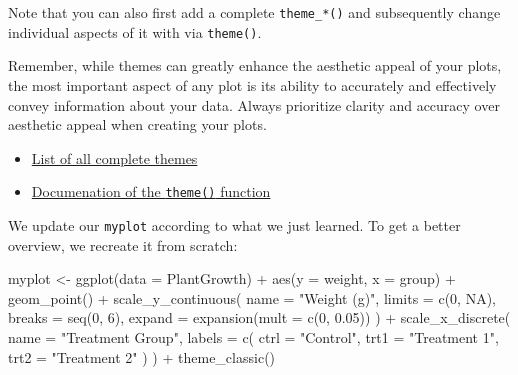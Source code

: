 \documentclass[
  letterpaper,
  DIV=11,
  numbers=noendperiod]{scrartcl}
\newenvironment{Shaded}{\begin{snugshade}}{\end{snugshade}}
\newcommand{\AttributeTok}[1]{\textcolor[rgb]{0.40,0.45,0.13}{#1}}
\newcommand{\ConstantTok}[1]{\textcolor[rgb]{0.56,0.35,0.01}{#1}}
\newcommand{\DecValTok}[1]{\textcolor[rgb]{0.68,0.00,0.00}{#1}}
\newcommand{\FloatTok}[1]{\textcolor[rgb]{0.68,0.00,0.00}{#1}}
\newcommand{\FunctionTok}[1]{\textcolor[rgb]{0.28,0.35,0.67}{#1}}
\newcommand{\NormalTok}[1]{\textcolor[rgb]{0.00,0.23,0.31}{#1}}
\newcommand{\OtherTok}[1]{\textcolor[rgb]{0.00,0.23,0.31}{#1}}
\newcommand{\SpecialCharTok}[1]{\textcolor[rgb]{0.37,0.37,0.37}{#1}}
\newcommand{\StringTok}[1]{\textcolor[rgb]{0.13,0.47,0.30}{#1}}
\providecommand{\tightlist}{%
  \setlength{\itemsep}{0pt}\setlength{\parskip}{0pt}}\usepackage{longtable,booktabs,array}
\begin{document}
Note that you can also first add a complete \texttt{theme\_*()} and
subsequently change individual aspects of it with via \texttt{theme()}.

Remember, while themes can greatly enhance the aesthetic appeal of your
plots, the most important aspect of any plot is its ability to
accurately and effectively convey information about your data. Always
prioritize clarity and accuracy over aesthetic appeal when creating your
plots.

\begin{tcolorbox}[enhanced jigsaw, left=2mm, title=\textcolor{quarto-callout-tip-color}{\faLightbulb}\hspace{0.5em}{Additional Resources}, toprule=.15mm, colback=white, coltitle=black, opacityback=0, breakable, titlerule=0mm, bottomtitle=1mm, toptitle=1mm, colbacktitle=quarto-callout-tip-color!10!white, arc=.35mm, rightrule=.15mm, bottomrule=.15mm, leftrule=.75mm, colframe=quarto-callout-tip-color-frame, opacitybacktitle=0.6]

\begin{itemize}
\tightlist
\item
  \href{https://ggplot2.tidyverse.org/reference/ggtheme.html}{List of
  all complete themes}
\item
  \href{https://ggplot2.tidyverse.org/reference/theme.html}{Documenation
  of the \texttt{theme()} function}
\end{itemize}

\end{tcolorbox}

We update our \texttt{myplot} according to what we just learned. To get
a better overview, we recreate it from scratch:

\begin{Shaded}
\begin{Highlighting}[]
\NormalTok{myplot }\OtherTok{\textless{}{-}} \FunctionTok{ggplot}\NormalTok{(}\AttributeTok{data =}\NormalTok{ PlantGrowth) }\SpecialCharTok{+}
  \FunctionTok{aes}\NormalTok{(}\AttributeTok{y =}\NormalTok{ weight, }\AttributeTok{x =}\NormalTok{ group) }\SpecialCharTok{+}
  \FunctionTok{geom\_point}\NormalTok{() }\SpecialCharTok{+}
  \FunctionTok{scale\_y\_continuous}\NormalTok{(}
    \AttributeTok{name =} \StringTok{"Weight (g)"}\NormalTok{,}
    \AttributeTok{limits =} \FunctionTok{c}\NormalTok{(}\DecValTok{0}\NormalTok{, }\ConstantTok{NA}\NormalTok{),}
    \AttributeTok{breaks =} \FunctionTok{seq}\NormalTok{(}\DecValTok{0}\NormalTok{, }\DecValTok{6}\NormalTok{),}
    \AttributeTok{expand =} \FunctionTok{expansion}\NormalTok{(}\AttributeTok{mult =} \FunctionTok{c}\NormalTok{(}\DecValTok{0}\NormalTok{, }\FloatTok{0.05}\NormalTok{))}
\NormalTok{  ) }\SpecialCharTok{+}
  \FunctionTok{scale\_x\_discrete}\NormalTok{(}
    \AttributeTok{name =} \StringTok{"Treatment Group"}\NormalTok{,}
    \AttributeTok{labels =} \FunctionTok{c}\NormalTok{(}
      \AttributeTok{ctrl =} \StringTok{"Control"}\NormalTok{, }
      \AttributeTok{trt1 =} \StringTok{"Treatment 1"}\NormalTok{, }
      \AttributeTok{trt2 =} \StringTok{"Treatment 2"}
\NormalTok{    )}
\NormalTok{  ) }\SpecialCharTok{+}
  \FunctionTok{theme\_classic}\NormalTok{()}
\end{Highlighting}
\end{Shaded}
\end{document}
